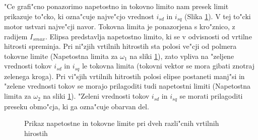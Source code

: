 \documentclass[journal,a4paper,twoside]{sty/IEEEtran}
\begin{document}
"Ce grafi"cno ponazorimo napetostno in tokovno limito nam presek limit prikazuje to"cko, ki ozna"cuje najve"cjo vrednost $i_{sd}$ in $i_{sq}$ (Slika \ref{fig:napetostna_tokovna_limita_slika}). V tej to"cki motor ustvari najve"cji navor. Tokovna limita je ponazorjena s kro"znico, z radijem $I_{smax}$. Elipsa predstavlja napetostno limito, ki se v odvisnosti od vrtilne hitrosti spreminja. Pri ni"zjih vrtilnih hitrostih sta polosi ve"cji od polmera tokovne limite (Napetostna limita za $\omega_1$ na sliki \ref{fig:napetostna_tokovna_limita_slika}), zato vpliva na "zeljene vrednosti tokov $i_{sd}$ in $i_{sq}$ le tokovna limita (tokovni vektor se mora gibati znotraj zelenega kroga). Pri vi"sjih vrtilnih hitrostih polosi elipse postaneti manj"si in "zelene vrednosti tokov se morajo prilagoditi tudi napetostni limiti (Napetostna limita za $\omega_2$ na sliki \ref{fig:napetostna_tokovna_limita_slika}). "Zeleni vrednosti tokov $i_{sd}$ in $i_{sq}$ se morati prilagoditi preseku obmo"cja, ki ga ozna"cuje obarvan del.

\begin{figure}
\caption{Prikaz napetostne in tokovne limite pri dveh razli"cnih vrtilnih hirostih}
\label{fig:napetostna_tokovna_limita_slika}
\end{figure}
\end{document}
